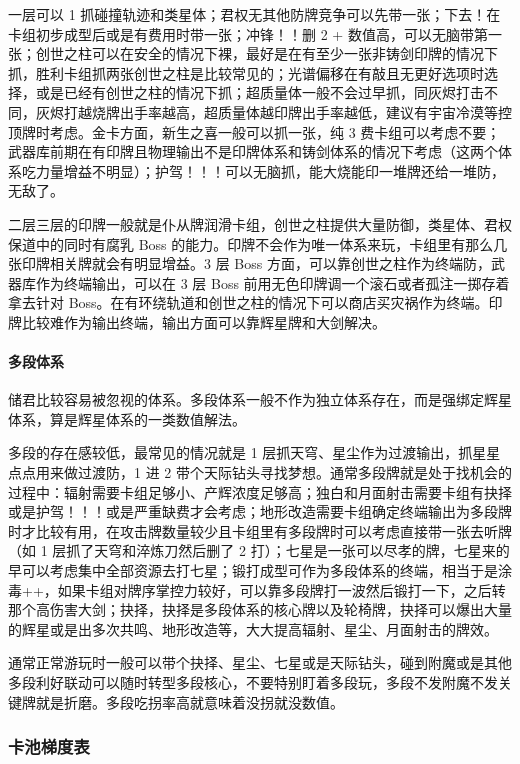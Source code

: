 \documentclass[12pt, a4paper]{article}
\begin{document}
一层可以 1 抓碰撞轨迹和类星体；君权无其他防牌竞争可以先带一张；下去！在卡组初步成型后或是有费用时带一张；冲锋！！删 2 + 数值高，可以无脑带第一张；创世之柱可以在安全的情况下裸，最好是在有至少一张非铸剑印牌的情况下抓，胜利卡组抓两张创世之柱是比较常见的；光谱偏移在有敲且无更好选项时选择，或是已经有创世之柱的情况下抓；超质量体一般不会过早抓，同灰烬打击不同，灰烬打越烧牌出手率越高，超质量体越印牌出手率越低，建议有宇宙冷漠等控顶牌时考虑。金卡方面，新生之喜一般可以抓一张，纯 3 费卡组可以考虑不要；武器库前期在有印牌且物理输出不是印牌体系和铸剑体系的情况下考虑（这两个体系吃力量增益不明显）；护驾！！！可以无脑抓，能大烧能印一堆牌还给一堆防，无敌了。

二层三层的印牌一般就是仆从牌润滑卡组，创世之柱提供大量防御，类星体、君权保道中的同时有腐乳 Boss 的能力。印牌不会作为唯一体系来玩，卡组里有那么几张印牌相关牌就会有明显增益。3 层 Boss 方面，可以靠创世之柱作为终端防，武器库作为终端输出，可以在 3 层 Boss 前用无色印牌调一个滚石或者孤注一掷存着拿去针对 Boss。在有环绕轨道和创世之柱的情况下可以商店买灾祸作为终端。印牌比较难作为输出终端，输出方面可以靠辉星牌和大剑解决。

\paragraph{多段体系}
储君比较容易被忽视的体系。多段体系一般不作为独立体系存在，而是强绑定辉星体系，算是辉星体系的一类数值解法。

多段的存在感较低，最常见的情况就是 1 层抓天穹、星尘作为过渡输出，抓星星点点用来做过渡防，1 进 2 带个天际钻头寻找梦想。通常多段牌就是处于找机会的过程中：辐射需要卡组足够小、产辉浓度足够高；独白和月面射击需要卡组有抉择或是护驾！！！或是严重缺费才会考虑；地形改造需要卡组确定终端输出为多段牌时才比较有用，在攻击牌数量较少且卡组里有多段牌时可以考虑直接带一张去听牌（如 1 层抓了天穹和淬炼刀然后删了 2 打）；七星是一张可以尽孝的牌，七星来的早可以考虑集中全部资源去打七星；锻打成型可作为多段体系的终端，相当于是涂毒++，如果卡组对牌序掌控力较好，可以靠多段牌打一波然后锻打一下，之后转那个高伤害大剑；抉择，抉择是多段体系的核心牌以及轮椅牌，抉择可以爆出大量的辉星或是出多次共鸣、地形改造等，大大提高辐射、星尘、月面射击的牌效。

通常正常游玩时一般可以带个抉择、星尘、七星或是天际钻头，碰到附魔或是其他多段利好联动可以随时转型多段核心，不要特别盯着多段玩，多段不发附魔不发关键牌就是折磨。多段吃拐率高就意味着没拐就没数值。

\subsubsection{卡池梯度表}
\end{document}
